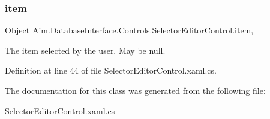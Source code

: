 \subsubsection{\texorpdfstring{item}{item}}
{\footnotesize\ttfamily Object Aim.\+Database\+Interface.\+Controls.\+Selector\+Editor\+Control.\+item\hspace{0.3cm}{\ttfamily [get]}, {\ttfamily [set]}}



The item selected by the user. May be null. 



Definition at line 44 of file Selector\+Editor\+Control.\+xaml.\+cs.



The documentation for this class was generated from the following file\+:\begin{DoxyCompactItemize}
\item 
Selector\+Editor\+Control.\+xaml.\+cs\end{DoxyCompactItemize}

